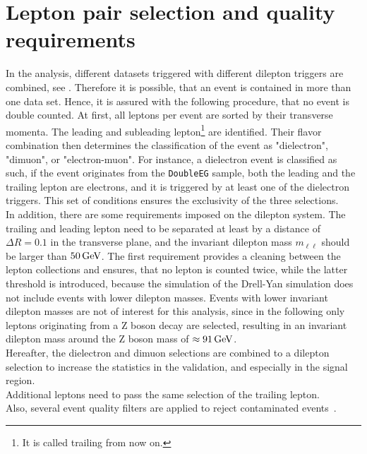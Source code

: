 \section{Lepton pair selection and quality requirements}\label{sec:lepPair}
In the analysis, different datasets triggered with different dilepton triggers are combined, see . Therefore it is possible, that an event is contained in more than one data set. Hence, it is assured with the following procedure, that no event is double counted. At first, all leptons per event are sorted by their transverse momenta. The leading and subleading lepton\footnote{It is called trailing from now on.} are identified. Their flavor combination then determines the classification of the event as "dielectron", "dimuon", or "electron-muon". For instance, a dielectron event is classified as such, if  the event originates from the \texttt{DoubleEG} sample, both the leading and the trailing lepton are electrons, and it is triggered by at least one of the dielectron triggers. This set of conditions ensures the exclusivity of the three selections.\\
In addition, there are some requirements imposed on the dilepton system. The trailing and leading lepton need to be separated at least by a distance of $\Delta R=0.1$ in the transverse plane, and the invariant dilepton mass $m_{\ell\ell}$ should be larger than $50\,\text{Ge\hspace{-.08em}V}$. The first requirement provides a cleaning between the lepton collections and ensures, that no lepton is counted twice, while the latter threshold is introduced, because the simulation of the Drell-Yan simulation does not include events with lower dilepton masses. Events with lower invariant dilepton masses are not of interest for this analysis, since in the following only leptons originating from a Z boson decay are selected, resulting in an invariant dilepton mass around the Z boson mass of $\approx91\,\text{Ge\hspace{-.08em}V}$.\\
Hereafter, the dielectron and dimuon selections are combined to a dilepton selection to increase the statistics in the validation, and especially in the signal region.\\
Additional leptons need to pass the same selection of the trailing lepton.
\\
Also, several event quality filters are applied to reject contaminated events~\cite{MetFilter}.
